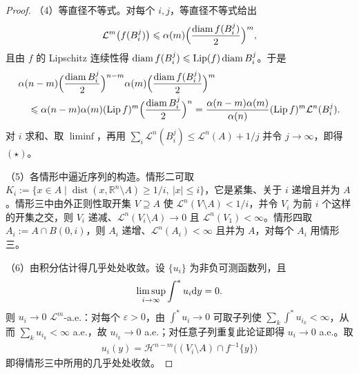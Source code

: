 \documentclass[../../main.tex]{subfiles}%
\begin{document}
\begin{proof}
（4）等直径不等式。对每个 $i,j$，等直径不等式给出
\begin{align*}
\mathcal{L}^m\bigl(f(B_i^j)\bigr)\leqslant\alpha(m)\Bigl(\frac{\operatorname{diam}f(B_i^j)}{2}\Bigr)^m,
\end{align*}
且由 $f$ 的 Lipschitz 连续性得 $\operatorname{diam}f(B_i^j)\leqslant\operatorname{Lip}(f)\operatorname{diam}B_i^j$。于是
\begin{align*}
&\alpha(n-m)\Bigl(\frac{\operatorname{diam}B_i^j}{2}\Bigr)^{n-m}\alpha(m)\Bigl(\frac{\operatorname{diam}f(B_i^j)}{2}\Bigr)^m\\
&\quad\leqslant\alpha(n-m)\alpha(m)(\operatorname{Lip} f)^m\Bigl(\frac{\operatorname{diam}B_i^j}{2}\Bigr)^n
=\frac{\alpha(n-m)\alpha(m)}{\alpha(n)}(\operatorname{Lip} f)^m\mathcal{L}^n(B_i^j).
\end{align*}
对 $i$ 求和、取 $\liminf$，再用 $\sum_i\mathcal{L}^n(B_i^j)\leqslant\mathcal{L}^n(A)+1/j$ 并令 $j\to\infty$，即得 $(\star)$。

（5）各情形中逼近序列的构造。情形二可取 $K_i:=\{x\in A\mid\operatorname{dist}(x,\mathbb{R}^n\setminus A)\geqslant1/i,\ \lvert x\rvert\leqslant i\}$，它是紧集、关于 $i$ 递增且并为 $A$。情形三中由外正则性取开集 $V\supseteq A$ 使 $\mathcal{L}^n(V\setminus A)<1/i$，并令 $V_i$ 为前 $i$ 个这样的开集之交，则 $V_i$ 递减、$\mathcal{L}^n(V_i\setminus A)\to0$ 且 $\mathcal{L}^n(V_1)<\infty$。情形四取 $A_i:=A\cap B(0,i)$，则 $A_i$ 递增、$\mathcal{L}^n(A_i)<\infty$ 且并为 $A$，对每个 $A_i$ 用情形三。

（6）由积分估计得几乎处处收敛。设 $\{u_i\}$ 为非负可测函数列，且
\begin{align*}
\limsup_{i\to\infty}\int^{*}u_i\mathrm{d} y=0.
\end{align*}
则 $u_i\to0$ $\mathcal{L}^m$-a.e.：对每个 $\varepsilon>0$，由 $\int^{*}u_i\to0$ 可取子列使 $\sum_k\int^{*}u_{i_k}<\infty$，从而 $\sum_k u_{i_k}<\infty$ a.e.，故 $u_{i_k}\to0$ a.e.；对任意子列重复此论证即得 $u_i\to0$ a.e.。取
\begin{align*}
u_i(y)=\mathcal{H}^{n-m}\bigl((V_i\setminus A)\cap f^{-1}\{y\}\bigr)
\end{align*}
即得情形三中所用的几乎处处收敛。
\end{proof}
\end{document}
